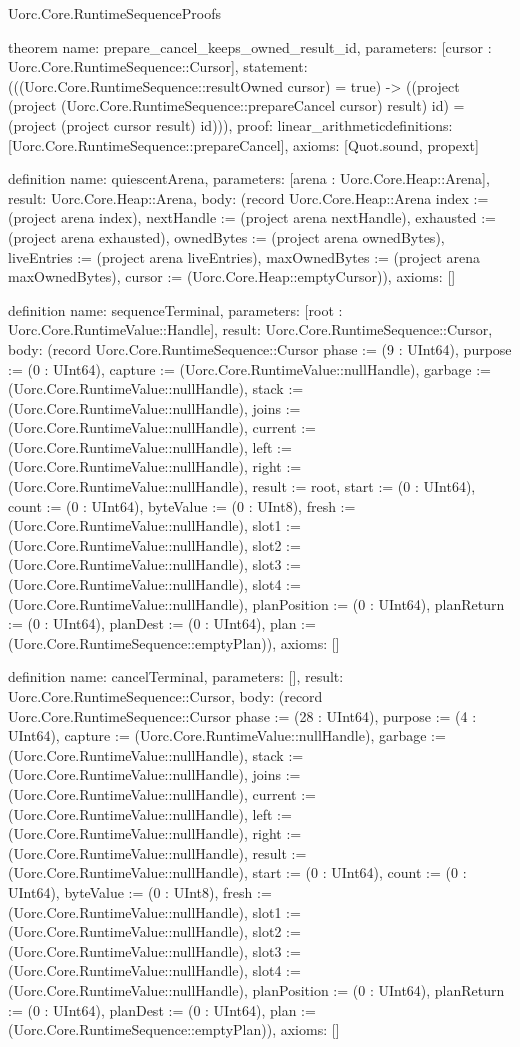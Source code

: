 \begin{lexlean}{Uorc.Core.RuntimeSequenceProofs}
\begin{semanticmodule}
theorem{
  name: prepare_cancel_keeps_owned_result_id,
  parameters: [cursor : Uorc.Core.RuntimeSequence::Cursor],
  statement: (((Uorc.Core.RuntimeSequence::resultOwned cursor) = true) -> ((project (project (Uorc.Core.RuntimeSequence::prepareCancel cursor) result) id) = (project (project cursor result) id))),
  proof: linear_arithmetic{definitions: [Uorc.Core.RuntimeSequence::prepareCancel]},
  axioms: [Quot.sound, propext]
}

definition{
  name: quiescentArena,
  parameters: [arena : Uorc.Core.Heap::Arena],
  result: Uorc.Core.Heap::Arena,
  body: (record Uorc.Core.Heap::Arena {index := (project arena index), nextHandle := (project arena nextHandle), exhausted := (project arena exhausted), ownedBytes := (project arena ownedBytes), liveEntries := (project arena liveEntries), maxOwnedBytes := (project arena maxOwnedBytes), cursor := (Uorc.Core.Heap::emptyCursor)}),
  axioms: []
}

definition{
  name: sequenceTerminal,
  parameters: [root : Uorc.Core.RuntimeValue::Handle],
  result: Uorc.Core.RuntimeSequence::Cursor,
  body: (record Uorc.Core.RuntimeSequence::Cursor {phase := (9 : UInt64), purpose := (0 : UInt64), capture := (Uorc.Core.RuntimeValue::nullHandle), garbage := (Uorc.Core.RuntimeValue::nullHandle), stack := (Uorc.Core.RuntimeValue::nullHandle), joins := (Uorc.Core.RuntimeValue::nullHandle), current := (Uorc.Core.RuntimeValue::nullHandle), left := (Uorc.Core.RuntimeValue::nullHandle), right := (Uorc.Core.RuntimeValue::nullHandle), result := root, start := (0 : UInt64), count := (0 : UInt64), byteValue := (0 : UInt8), fresh := (Uorc.Core.RuntimeValue::nullHandle), slot1 := (Uorc.Core.RuntimeValue::nullHandle), slot2 := (Uorc.Core.RuntimeValue::nullHandle), slot3 := (Uorc.Core.RuntimeValue::nullHandle), slot4 := (Uorc.Core.RuntimeValue::nullHandle), planPosition := (0 : UInt64), planReturn := (0 : UInt64), planDest := (0 : UInt64), plan := (Uorc.Core.RuntimeSequence::emptyPlan)}),
  axioms: []
}

definition{
  name: cancelTerminal,
  parameters: [],
  result: Uorc.Core.RuntimeSequence::Cursor,
  body: (record Uorc.Core.RuntimeSequence::Cursor {phase := (28 : UInt64), purpose := (4 : UInt64), capture := (Uorc.Core.RuntimeValue::nullHandle), garbage := (Uorc.Core.RuntimeValue::nullHandle), stack := (Uorc.Core.RuntimeValue::nullHandle), joins := (Uorc.Core.RuntimeValue::nullHandle), current := (Uorc.Core.RuntimeValue::nullHandle), left := (Uorc.Core.RuntimeValue::nullHandle), right := (Uorc.Core.RuntimeValue::nullHandle), result := (Uorc.Core.RuntimeValue::nullHandle), start := (0 : UInt64), count := (0 : UInt64), byteValue := (0 : UInt8), fresh := (Uorc.Core.RuntimeValue::nullHandle), slot1 := (Uorc.Core.RuntimeValue::nullHandle), slot2 := (Uorc.Core.RuntimeValue::nullHandle), slot3 := (Uorc.Core.RuntimeValue::nullHandle), slot4 := (Uorc.Core.RuntimeValue::nullHandle), planPosition := (0 : UInt64), planReturn := (0 : UInt64), planDest := (0 : UInt64), plan := (Uorc.Core.RuntimeSequence::emptyPlan)}),
  axioms: []
}


\end{semanticmodule}
\end{lexlean}
